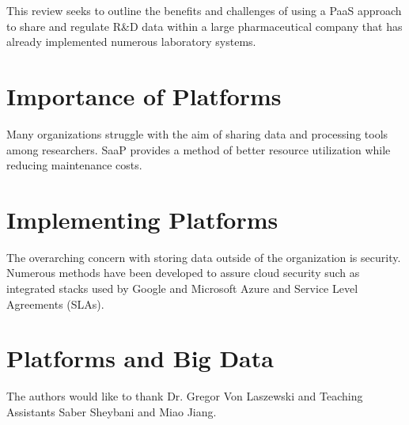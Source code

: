 \documentclass[sigconf]{acmart}
\begin{document}
This review seeks to outline the benefits and challenges of using a PaaS approach to share and regulate R\&D data within a large pharmaceutical company that has already implemented numerous laboratory systems. 

\section{Importance of Platforms}
Many organizations struggle with the aim of sharing data and processing tools among researchers. SaaP provides a method of better resource utilization while reducing maintenance costs\cite{Oh}. 

\section{Implementing Platforms}
The overarching concern with storing data outside of the organization is security. Numerous methods have been developed to assure cloud security such as integrated stacks used by Google and Microsoft Azure and Service Level Agreements (SLAs)\cite{Casola}.


\section{Platforms and Big Data}


\begin{acks}

  The authors would like to thank Dr. Gregor Von Laszewski  and Teaching Assistants Saber Sheybani and Miao Jiang.

\end{acks}


 
\end{document}

